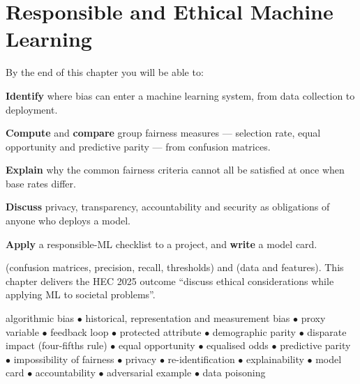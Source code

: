 \chapter{Responsible and Ethical Machine Learning}\label{ch:ethics}

\begin{outcomes}
By the end of this chapter you will be able to:
\begin{tight}
  \item \textbf{Identify} where bias can enter a machine learning system, from data
        collection to deployment.
  \item \textbf{Compute} and \textbf{compare} group fairness measures --- selection
        rate, equal opportunity and predictive parity --- from confusion matrices.
  \item \textbf{Explain} why the common fairness criteria cannot all be satisfied at
        once when base rates differ.
  \item \textbf{Discuss} privacy, transparency, accountability and security as
        obligations of anyone who deploys a model.
  \item \textbf{Apply} a responsible-ML checklist to a project, and \textbf{write} a
        model card.
\end{tight}
\end{outcomes}

\begin{prereq}
 (confusion matrices, precision, recall, thresholds) and
 (data and features). This chapter delivers the HEC 2025 outcome
``discuss ethical considerations while applying ML to societal problems''.
\end{prereq}

\begin{keyterms}
algorithmic bias $\bullet$ historical, representation and measurement bias
$\bullet$ proxy variable $\bullet$ feedback loop $\bullet$ protected attribute
$\bullet$ demographic parity $\bullet$ disparate impact (four-fifths rule)
$\bullet$ equal opportunity $\bullet$ equalised odds $\bullet$ predictive parity
$\bullet$ impossibility of fairness $\bullet$ privacy $\bullet$ re-identification
$\bullet$ explainability $\bullet$ model card $\bullet$ accountability $\bullet$
adversarial example $\bullet$ data poisoning
\end{keyterms}

